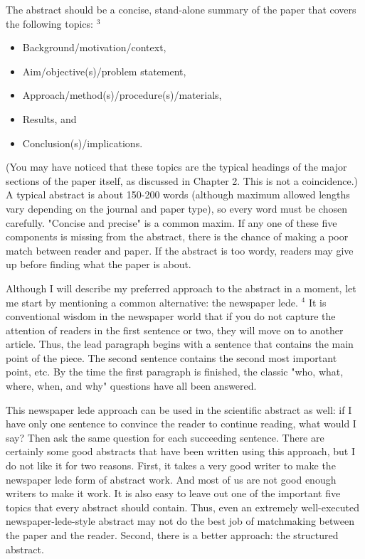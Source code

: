 The abstract should be a concise, stand-alone summary of the paper that covers the following topics: ${ }^{3}$

\begin{itemize}
  \item Background/motivation/context,
  \item Aim/objective(s)/problem statement,
  \item Approach/method(s)/procedure(s)/materials,
  \item Results, and
  \item Conclusion(s)/implications.
\end{itemize}

(You may have noticed that these topics are the typical headings of the major sections of the paper itself, as discussed in Chapter 2. This is not a coincidence.) A typical abstract is about 150-200 words (although maximum allowed lengths vary depending on the journal and paper type), so every word must be chosen carefully. "Concise and precise" is a common maxim. If any one of these five components is missing from the abstract, there is the chance of making a poor match between reader and paper. If the abstract is too wordy, readers may give up before finding what the paper is about.

Although I will describe my preferred approach to the abstract in a moment, let me start by mentioning a common alternative: the newspaper lede. ${ }^{4}$ It is conventional wisdom in the newspaper world that if you do not capture the attention of readers in the first sentence or two, they will move on to another article. Thus, the lead paragraph begins with a sentence that contains the main point of the piece. The second sentence contains the second most important point, etc. By the time the first paragraph is finished, the classic "who, what, where, when, and why" questions have all been answered.

This newspaper lede approach can be used in the scientific abstract as well: if I have only one sentence to convince the reader to continue reading, what would I say? Then ask the same question for each succeeding sentence. There are certainly some good abstracts that have been written using this approach, but I do not like it for two reasons. First, it takes a very good writer to make the newspaper lede form of abstract work. And most of us are not good enough writers to make it work. It is also easy to leave out one of the important five topics that every abstract should contain. Thus, even an extremely well-executed newspaper-lede-style abstract may not do the best job of matchmaking between the paper and the reader. Second, there is a better approach: the structured abstract.

